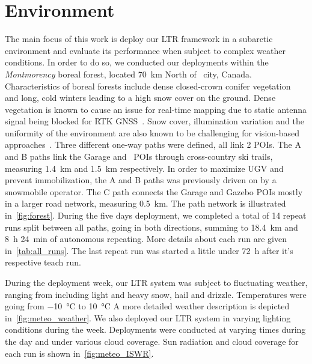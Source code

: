 \section{Environment}
\label{sec:env}

The main focus of this work is deploy our \ac{LTR} framework in a subarctic environment and evaluate its performance when subject to complex weather conditions.
In order to do so, we conducted our deployments within the \textit{Montmorency} boreal forest, located \SI{70}{km} North of \quebec~city, Canada.
Characteristics of boreal forests include dense closed-crown conifer vegetation~\citep{Russell1988} and long, cold winters leading to a high snow cover on the ground.
Dense vegetation is known to cause an issue for real-time mapping due to static antenna signal being blocked for \ac{RTK} \ac{GNSS}~\citep{Babin2019}.
Snow cover, illumination variation and the uniformity of the environment are also known to be challenging for vision-based approaches~\citep{Paton2017}.
Three different one-way paths were defined, all link 2 \acp{POI}. %
The A  and B paths link the Garage and \laverdiere~\acp{POI} through cross-country ski trails, measuring \SI{1.4}{km} and \SI{1.5}{km} respectively.
In order to maximize \ac{UGV} and prevent immobilization, the A and B paths was previously driven on by a snowmobile operator.
The C path connects the Garage and Gazebo \acp{POI} mostly in a larger road network, measuring \SI{0.5}{km}.
The path network is illustrated in~\autoref{fig:forest}.
During the five days deployment, we completed a total of 14 repeat runs split between all paths, going in both directions, summing to \SI{18.4}{km} and \SI{8}{h} \SI{24}{min} of autonomous repeating.
More details about each run are given in~\autoref{tab:all_runs}.
The last repeat run was started a little under \SI{72}{h} after it's respective teach run. 

During the deployment week, our \ac{LTR} system was subject to fluctuating weather, ranging from including light and heavy snow, hail and drizzle. 
Temperatures were going from \SI{-10}{\celsius} to \SI{10}{\celsius}
A more detailed weather description is depicted in~\autoref{fig:meteo_weather}. 
We also deployed our \ac{LTR} system in varying lighting conditions during the week. 
Deployments were conducted at varying times during the day and under various cloud coverage. 
Sun radiation and cloud coverage for each run is shown in~\autoref{fig:meteo_ISWR}.

